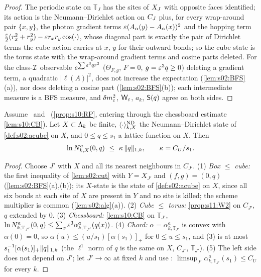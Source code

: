 \begin{proof}
The periodic state on $\mathbb T_J$ has the sites of $X_J$ with opposite faces identified; its action is the Neumann--Dirichlet action on $C_J$ plus, for every wrap-around pair $\{x,y\}$, the photon gradient terms $\varepsilon(A_\alpha(y)-A_\alpha(x))^2$ and the hopping term $\frac{\varepsilon}2(r_x^2+r_y^2)-\varepsilon r_xr_y\cos(\cdot)$, whose diagonal part is exactly the pair of Dirichlet terms the cube action carries at $x$, $y$ for their outward bonds; so the cube state is the torus state with the wrap-around gradient terms and cosine parts deleted. For the class-$\mathcal I$ observable $e^{\sum\varepsilon^3qr^2}$ ($\Theta_{F,g}$, $F=0$, $g=\varepsilon^3q\ge0$) deleting a gradient term, a quadratic $|\ell(A)|^2$, does not increase the expectation (\cref{lem:s02:BFS}(a)), nor does deleting a cosine part (\cref{lem:s02:BFS}(b)); each intermediate measure is a BFS measure, and $\delta m^2_{\varepsilon}$, $\mathsf W_{\varepsilon}$, $a_k$, $\mathsf S(q)$ agree on both sides.
\end{proof}

\begin{proposition}\label{prop:s11:W1prime}
Assume \Itwo\ and \Ithree\ (\cref{prop:s10:RP}, entering through the chessboard estimate \cref{lem:s10:CB}). Let $X\subset\Lambda_k$ be finite, $\langle\cdot\rangle^{\mathrm{ND}}_{k,X}$ the Neumann--Dirichlet state of \cref{def:s02:acube} on $X$, and $0\le q\le s_1$ a lattice function on $X$. Then
\[
\ln N^a_{k,X}(0,q)\ \le\ \kappa\,\norm{q}_{1,k},\qquad\kappa=C_U/s_1 .
\]
\end{proposition}

\begin{proof}
Choose $J'$ with $X$ and all its nearest neighbours in $C_{J'}$. (1) \emph{Box $\le$ cube:} the first inequality of \cref{lem:s02:cut} with $Y=X_{J'}$ and $(f,g)=(0,q)$ (\cref{lem:s02:BFS}(a),(b)); its $X$-state is the state of \cref{def:s02:acube} on $X$, since all six bonds at each site of $X$ are present in $Y$ and no site is killed; the scheme multiplier is common (\cref{lem:s02:alg}(a)). (2) \emph{Cube $\le$ torus:} \cref{prop:s11:W2} on $C_{J'}$, $q$ extended by $0$. (3) \emph{Chessboard:} \cref{lem:s10:CB} on $\mathbb T_{J'}$, $\ln N^a_{k,\mathbb T_{J'}}(0,q)\le\sum_x\varepsilon^3\alpha^a_{k,\mathbb T_{J'}}(q(x))$. (4) \emph{Chord:} $\alpha=\alpha^a_{k,\mathbb T_{J'}}$ is convex with $\alpha(0)=0$, so $\alpha(u)\le(u/s_1)[\alpha(s_1)]_+$ for $0\le u\le s_1$, and (3) is at most $s_1^{-1}[\alpha(s_1)]_+\lVert q\rVert_{1,k}$ (the $\ell^1$ norm of $q$ is the same on $X$, $C_{J'}$, $\mathbb T_{J'}$). (5) The left side does not depend on $J'$; let $J'\to\infty$ at fixed $k$ and use \Itwo: $\limsup_{J'}\alpha^a_{k,\mathbb T_{J'}}(s_1)\le C_U$ for every $k$.
\end{proof}

